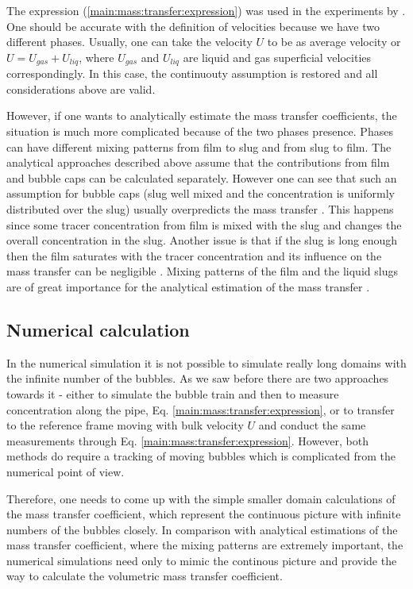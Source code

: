 \documentclass{article}
\begin{document}
The expression (\ref{main:mass:transfer:expression}) was used in the experiments by
\citet{bercic-mass}. One should be accurate with the definition of velocities because we have two
different phases. Usually, one can take the velocity $U$ to be as
average velocity or $U=U_{gas}+U_{liq}$, where $U_{gas}$ and $U_{liq}$ are liquid and gas
superficial velocities correspondingly. In this case, the continuouty assumption is restored and
all considerations above are valid.

 However, if one wants to analytically estimate the mass transfer coefficients, the situation is
much more complicated because of the two phases presence. Phases can have different mixing patterns
from film to slug and from slug to film. The analytical approaches described above assume that the
contributions from film and bubble caps can be calculated separately. However one can see that such 
an assumption for bubble caps (slug well mixed and the concentration is uniformly distributed over
the slug) usually overpredicts the mass transfer \cite{irandoust}. This happens since some tracer
concentration from film is mixed with the slug and changes the overall concentration in the slug.
Another issue is that if the slug is long enough then the film saturates with the tracer
concentration and its influence on the mass transfer can be negligible \cite{vanbaten-circular}.
Mixing patterns of the film and the liquid slugs are of great importance for the analytical
estimation of the mass transfer \cite{yue-mass}.
 
\subsection{Numerical calculation}
In the numerical simulation it is not possible to simulate really long domains with the infinite
number of the bubbles. As we saw before there are two approaches towards it - either to simulate
the bubble train and then to measure concentration along the pipe, Eq.
\ref{main:mass:transfer:expression}, or to transfer to the reference frame moving with bulk
velocity $U$ and conduct the same measurements through Eq. \ref{main:mass:transfer:expression}.
However, both methods do require a tracking of moving bubbles which is complicated from the
numerical point of view.

Therefore, one needs to come up with the simple smaller domain calculations
of the mass transfer coefficient, which represent the continuous picture with infinite numbers of
the bubbles closely. In comparison with analytical estimations of the mass transfer coefficient,
where the mixing patterns are extremely important, the numerical simulations need only to mimic
the continous picture and provide the way to calculate the volumetric mass transfer coefficient. 
\end{document}
